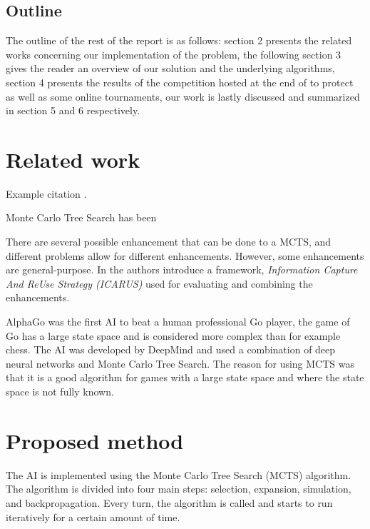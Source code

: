 \documentclass[a4paper,12pt]{article}
\begin{document}
\subsection{Outline}
The outline of the rest of the report is as follows: section 2 presents the related works concerning our implementation of the problem, the following section 3 gives the reader an overview of our solution and the underlying algorithms, section 4 presents the results of the competition hosted at the end of to protect as well as some online tournaments, our work is lastly discussed and summarized in section 5 and 6 respectively.


\newpage
\section{Related work}
\label{sec:relwork}

Example citation \cite{RussellNorvigAIBook3rd}.

Monte Carlo Tree Search has been 

There are several possible enhancement that can be done to a MCTS, and different problems allow for different enhancements. However, some enhancements are general-purpose. In \cite{POWLEY201492} the authors introduce a framework, \textit{Information Capture And ReUse Strategy (ICARUS)} used for evaluating and combining the enhancements. 


AlphaGo was the first AI to beat a human professional Go player, the game of Go has a large state space and is considered more complex than for example chess. The AI was developed by DeepMind and used a combination of deep neural networks and Monte Carlo Tree Search. The reason for using MCTS was that it is a good algorithm for games with a large state space and where the state space is not fully known. %






\newpage
\section{Proposed method}
\label{sec:method}

The AI is implemented using the Monte Carlo Tree Search (MCTS) algorithm. The algorithm is divided into four main steps: selection, expansion, simulation, and backpropagation. Every turn, the algorithm is called and starts to run iteratively for a certain amount of time. 
\end{document}
